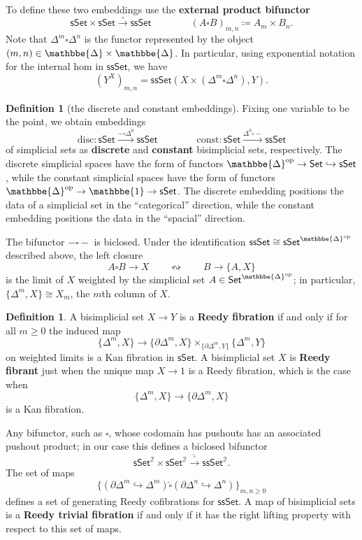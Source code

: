 \documentclass[12pt]{amsart}
\theoremstyle{plain}
\theoremstyle{definition}
\newtheorem{defn}[thm]{Definition}
\theoremstyle{remark}
\numberwithin{equation}{section}
\newcommand{\defeq}{\coloneqq}
\newcommand{\two}{\mathbb{2}}
\newcommand{\Set}{\mathsf{Set}}
\newcommand{\sSet}{\mathsf{sSet}}
\newcommand{\ssSet}{\mathsf{ssSet}}
\newcommand{\DDelta}{\mathbbe{\Delta}}
\newcommand{\op}{\mathrm{op}}
\begin{document}
To define these two embeddings use the \textbf{external product bifunctor}
\[ \sSet \times \sSet \xrightarrow{\square} \ssSet \qquad \qquad (A \square B)_{m,n} \defeq A_m \times B_n.\]
Note that $\Delta^m \square \Delta^n$ is the functor represented by the object $(m,n) \in \DDelta \times \DDelta$. In particular, using exponential notation for the internal hom in $\ssSet$, we have \[ (Y^X)_{m,n} = \ssSet(X \times (\Delta^m \square \Delta^n), Y).\]

\begin{defn}[the discrete and constant embeddings]
Fixing one variable to be the point, we obtain embeddings
\[ \mathrm{disc} \colon \sSet \xrightarrow{-\square \Delta^0} \ssSet \qquad \qquad \mathrm{const} \colon \sSet \xrightarrow{\Delta^0\square-} \ssSet\] of simplicial sets as \textbf{discrete} and \textbf{constant} bisimplicial sets, respectively. The discrete simplicial spaces have the form of functors $\DDelta^\op \to \Set \hookrightarrow \sSet$, while the constant simplicial spaces have the form of functors $\DDelta^\op \to \mathbbe{1} \to \sSet$. The discrete embedding positions the data of a simplicial set in the ``categorical'' direction, while the constant embedding positions the data in the ``spacial'' direction.
\end{defn}

The bifunctor $-\square -$ is biclosed. Under the identification $\ssSet \cong \sSet^{\DDelta^\op}$ described above, the left closure
\[ A \square B \to X \qquad \leftrightsquigarrow \qquad B \to \{A, X\}\] is the limit of $X$ weighted by the simplicial set $A \in \Set^{\DDelta^\op}$; in particular, $\{\Delta^m,X\} \cong X_m$, the $m$th column of $X$. 


\begin{defn} A bisimplicial set $X \to Y$ is a \textbf{Reedy fibration} if and only if for all $m \geq 0$ the induced map
\[ \{ \Delta^m,X\} \to \{\partial\Delta^m,X\} \times_{\{\partial\Delta^m,Y\}} \{\Delta^m , Y\}\] on weighted limits is a Kan fibration in $\sSet$. A bisimplicial set $X$ is \textbf{Reedy fibrant} just when the unique map $X \to 1$ is a Reedy fibration, which is the case when
\[ \{ \Delta^m, X\} \to \{\partial\Delta^m,X\}\] is a Kan fibration.
\end{defn}

Any bifunctor, such as $\square$, whose codomain has pushouts has an associated pushout product; in our case this defines a biclosed bifunctor
\[  \sSet^\two \times \sSet^\two \xrightarrow{\widehat{\square}} \ssSet^\two.\] The set of maps 
\[ \{ (\partial\Delta^m\hookrightarrow\Delta^m)\mathbin{\widehat{\square}}(\partial\Delta^n\hookrightarrow\Delta^n)\}_{m,n \geq 0}\] defines a set of generating Reedy cofibrations for $\ssSet$. A map of bisimplicial sets is a \textbf{Reedy trivial fibration} if and only if it has the right lifting property with respect to this set of maps.
\end{document}
